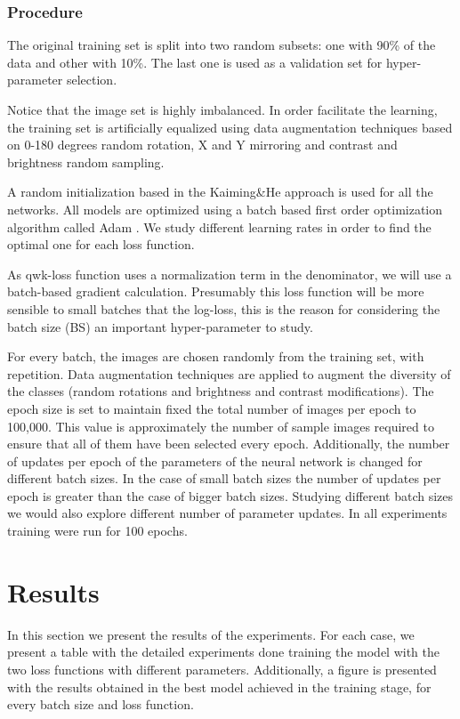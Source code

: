 \subsubsection{Procedure}

The original training set is split into two random subsets: one with 90\% of the data and other with 10\%. The last one is used as a validation set for hyper-parameter selection. 

Notice that the image set is highly imbalanced. In order facilitate the learning, the training set is artificially equalized using data augmentation techniques \citep{Krizhevsky:2012} based on 0-180 degrees random rotation, X and Y mirroring and contrast and brightness random sampling.

A random initialization based in the Kaiming\&He approach \citep{kaiming} is used for all the networks. All models are optimized using a batch based first order optimization algorithm called Adam \citep{DBLP:journals/corr/KingmaB14}. We study different learning rates in order to find the optimal one for each loss function. 

As qwk-loss function uses a normalization term in the denominator, we will use a batch-based gradient calculation. Presumably this loss function will be more sensible to small batches that the log-loss, this is the reason for considering the batch size (BS) an important hyper-parameter to study.

For every batch, the images are chosen randomly from the training set, with repetition. Data augmentation techniques are applied to augment the diversity of the classes (random rotations and brightness and contrast modifications). The epoch size is set to maintain fixed the total number of images per epoch to 100,000. This value is approximately the number of sample images required to ensure that all of them have been selected every epoch. Additionally, the number of updates per epoch of the parameters of the neural network is changed for different batch sizes. In the case of small batch sizes the number of updates per epoch is greater than the case of bigger batch sizes. Studying different batch sizes we would also explore different number of parameter updates. In all experiments training were run for 100 epochs.

\section{Results}\label{loss:res}

In this section we present the results of the experiments. For each case, we present a table with the detailed experiments done training the model with the two loss functions with different parameters. Additionally, a figure is presented with the results obtained in the best model achieved in the training stage, for every batch size and loss function. 


